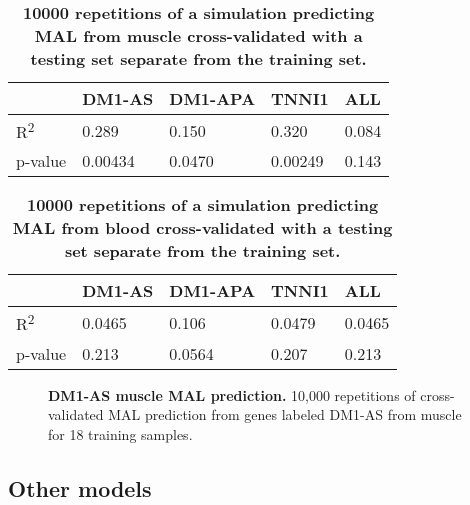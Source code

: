 \documentclass[10pt,letterpaper]{article}
\begin{document}
\begin{table}[!ht]
\begin{adjustwidth}{-2.25in}{0in} %
\centering
\caption{{\bf 10000 repetitions of a simulation predicting MAL from muscle cross-validated with a testing set separate from the training set.}}

\begin{tabular}{|l|l|l|l|l|}
\hline
 & DM1-AS & DM1-APA & TNNI1 & ALL \\ \hline
R\textsuperscript{2} & 0.289 & 0.150 & 0.320 & 0.084 \\ \hline
p-value & 0.00434 & 0.0470 & 0.00249 & 0.143 \\ \hline
\end{tabular}

\label{muscle_results_table}
\end{adjustwidth}
\end{table}

\begin{table}[!ht]
\begin{adjustwidth}{-2.25in}{0in} %
\centering
\caption{{\bf 10000 repetitions of a simulation predicting MAL from blood cross-validated with a testing set separate from the training set.}}

\begin{tabular}{|l|l|l|l|l|}
\hline
 & DM1-AS & DM1-APA & TNNI1 & ALL \\ \hline
R\textsuperscript{2} & 0.0465 & 0.106 & 0.0479 & 0.0465 \\ \hline
p-value & 0.213 & 0.0564 & 0.207 & 0.213 \\ \hline
\end{tabular}

\label{blood_results_table}
\end{adjustwidth}
\end{table}



\begin{figure}[!h]
\caption{{\bf DM1-AS muscle MAL prediction.} 10,000 repetitions of cross-validated MAL prediction from genes labeled DM1-AS from muscle for 18 training samples.}
\label{fig1}
\end{figure}

\subsection*{Other models}
\end{document}
